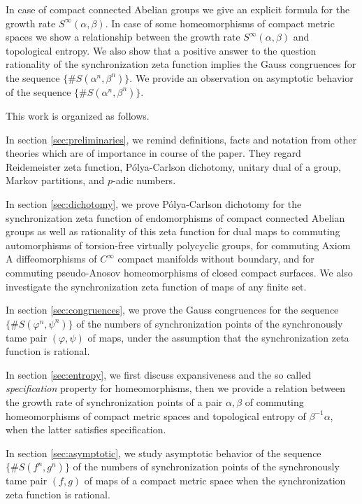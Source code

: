 \documentclass[oneside]{amsart}
\begin{document}
In case of compact connected Abelian groups we give an explicit formula
for the growth rate $S^\infty(\alpha,\beta)$.
In case of some homeomorphisms of compact metric spaces we show a relationship between
the growth rate $S^\infty(\alpha,\beta)$ and topological entropy.
We also show that a positive answer to the question  rationality of the synchronization zeta function implies  the Gauss congruences
for the sequence $\{\# S(\alpha^n,\beta^n) \}$.
We provide an observation on asymptotic behavior of the sequence $\{\# S(\alpha^n,\beta^n) \}$.


This work is organized as follows.

In section \ref{sec:preliminaries}, we remind definitions, facts and notation
from other theories which are of importance in course of the paper.
They regard Reidemeister zeta function, P\'olya-Carlson dichotomy, unitary dual of a group,
Markov partitions, and $p$-adic numbers.

In section \ref{sec:dichotomy}, we prove  P\'olya-Carlson dichotomy  for the
synchronization  zeta function of  endomorphisms of compact connected Abelian groups
as well as rationality of this zeta function  for dual maps to commuting automorphisms
of torsion-free virtually polycyclic groups, for commuting Axiom A diffeomorphisms
of $C^\infty$ compact manifolds without boundary, and for commuting pseudo-Anosov homeomorphisms
of closed compact surfaces.
We also investigate the synchronization zeta function of maps of any finite set.

In section \ref{sec:congruences}, we prove the Gauss congruences for the sequence
$\{\# S(\varphi^n,\psi^n) \}$ of the  numbers of synchronization points of the synchronously
tame pair $(\varphi,\psi)$ of maps, under the assumption that the synchronization zeta function is rational.

In section \ref{sec:entropy}, we first discuss expansiveness and the so called \emph{specification} property
for homeomorphisms, then we provide a relation between the growth rate of synchronization points
of a pair $\alpha, \beta$ of commuting homeomorphisms of compact metric spaces and topological entropy
of $\beta^{-1}\alpha$, when the latter satisfies specification.

In section \ref{sec:asymptotic}, we study asymptotic behavior of the sequence
$\{\# S(f^n, g^n) \}$ of the numbers of synchronization points of the synchronously
tame pair $( f, g )$ of  maps of a compact metric space when the synchronization
zeta function is rational.
\end{document}
